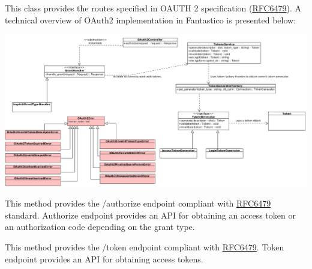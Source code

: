 \documentclass[letterpaper,10pt,english]{sphinxmanual}
\begin{document}
\begin{fulllineitems}
\label{features/oauth2/technical_summary:fantastico.oauth2.oauth2_controller.OAuth2Controller}
This class provides the routes specified in OAUTH 2 specification (\href{http://tools.ietf.org/html/rfc6749}{RFC6479}). A
technical overview of OAuth2 implementation in Fantastico is presented below:

\includegraphics{oauth2_overview.png}

\begin{fulllineitems}
\label{features/oauth2/technical_summary:fantastico.oauth2.oauth2_controller.OAuth2Controller.handle_authorize}
This method provides the /authorize endpoint compliant with \href{http://tools.ietf.org/html/rfc6749}{RFC6479} standard.
Authorize endpoint provides an API for obtaining an access token or an authorization code depending on the grant type.

\end{fulllineitems}


\begin{fulllineitems}
\label{features/oauth2/technical_summary:fantastico.oauth2.oauth2_controller.OAuth2Controller.handle_token}
This method provides the /token endpoint compliant with \href{http://tools.ietf.org/html/rfc6749}{RFC6479}.
Token endpoint provides an API for obtaining access tokens.

\end{fulllineitems}


\end{fulllineitems}
\end{document}
